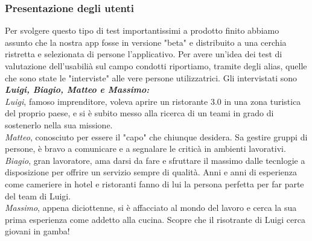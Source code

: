     \subsubsection{Presentazione degli utenti}
        \begin{flushleft}
            Per svolgere questo tipo di test importantissimi a prodotto finito abbiamo assunto che la nostra app fosse in versione "beta" e
            distribuito a una cerchia ristretta e selezionata di persone l'applicativo.
            Per avere un'idea dei test di valutazione dell'usabilià sul campo condotti riportiamo, tramite degli alias, quelle che sono state le
            "interviste" alle vere persone utilizzatrici.
            Gli intervistati sono \textbf{\emph{Luigi, Biagio, Matteo e Massimo:}}
            \\\emph{Luigi}, famoso imprenditore, voleva aprire un ristorante 3.0 in una zona turistica del proprio paese, e si è subito messo alla ricerca di un teami
            in grado di sostenerlo nella sua missione. 
            \\\emph{Matteo}, conosciuto per essere il "capo" che chiunque desidera. Sa gestire gruppi di persone, è bravo a comunicare e a segnalare le criticà in ambienti lavorativi.
            \\\emph{Biagio}, gran lavoratore, ama darsi da fare e sfruttare il massimo dalle tecnlogie a disposizione per offrire un servizio sempre di qualità.
            Anni e anni di esperienza come cameriere in hotel e ristoranti fanno di lui la persona perfetta per far parte del team di Luigi.
            \\\emph{Massimo}, appena diciottenne, si è affacciato al mondo del lavoro e cerca la sua prima esperienza come addetto alla cucina. Scopre che il risotrante di Luigi cerca giovani in gamba!
        
        \end{flushleft}

